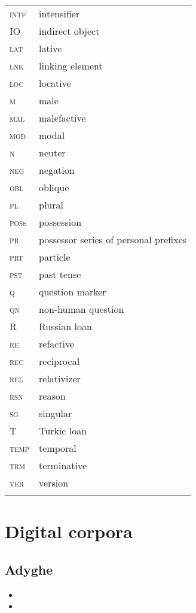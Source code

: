 \documentclass[output=paper,colorlinks,citecolor=brown, draft]{langscibook}
\begin{document}
\begin{tabularx}{.45\textwidth}{@{}lQ@{}}
\textsc{intf} & intensifier \\
IO & indirect object \\
\textsc{lat} & lative \\
\textsc{lnk} & linking element \\
\textsc{loc} & {locative} \\
\textsc{m} & male \\
\textsc{mal} & malefactive \\
\textsc{mod} & modal \\
\textsc{n} & neuter \\
\textsc{neg} & negation \\
\textsc{obl} & {oblique} \\
\textsc{pl} & plural \\
\textsc{pos}s & possession \\
\textsc{pr }& possessor series of personal prefixes \\
\textsc{prt} & particle \\
\textsc{pst} & past tense \\
\textsc{q} & question marker \\
\textsc{qn} & non-human question \\
R & Russian loan \\
\textsc{re} & refactive \\
\textsc{rec} & reciprocal \\
\textsc{rel} & relativizer \\
\textsc{rsn} & reason \\
\textsc{sg} & singular \\
T & Turkic loan \\
\textsc{temp} & temporal \\
\textsc{trm} & terminative \\
\textsc{ver} & version \\
\\
\end{tabularx}


\section*{Digital corpora}
\subsection*{Adyghe}

\begin{itemize}
  \item {}
\item {}
\end{itemize}
\end{document}
